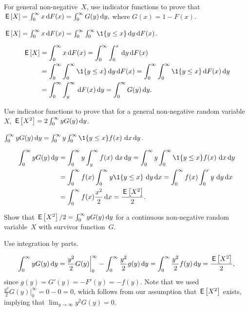 \documentclass[stochastic-or.tex]{subfiles}
\begin{document}
\begin{exercise}\label{ex:l-107}
For  general non-negative~$X$,  use indicator functions to prove that
$ \,\mathsf{E}\left[X\right] = \int_0^\infty x \,\textrm{d}F(x) = \int_0^\infty G(y) \,\textrm{d}y,$
where $G(x) = 1 - F(x)$.
\begin{hint}
$\E X = \int_0^\infty x \d F( x) = \int_0^\infty \int_0^\infty \1{y\leq x} \d y \d F(x)$.
\end{hint}
\begin{solution}
 \begin{align*}
 \E{X} &= \int_0^\infty x \d F(x) = \int_0^\infty \int_0^x \d y \d F(x) \\
 & = \int_0^\infty \int_0^\infty \1{y\leq x} \d y \d F(x) = \int_0^\infty \int_0^\infty \1{y\leq x} \d F(x) \d y\\
 & = \int_0^\infty \int_y^\infty\d  F(x) \d y = \int_0^\infty G(y) \d y.
 \end{align*}
\end{solution}
\end{exercise}


\begin{exercise}\label{ex:14}
  Use indicator functions to prove that for a general non-negative random variable~$X$, $ \,\mathsf{E}\left[X^2\right] = 2 \int_0^\infty y G(y) \,\textrm{d}y$.
\begin{hint}
$\int_0^\infty y G(y) \d y = \int_0^\infty y \int_0^\infty \1{y\leq x}f(x)\, \d x \d y$.
\end{hint}
\begin{solution}
 \begin{align*}
\int_0^\infty y G(y) \d y
&= \int_0^\infty y \int_y^\infty f(x)\, \d x \d y = \int_0^\infty y \int_0^\infty \1{y\leq x}f(x)\, \d x \d y\\
&= \int_0^\infty f(x) \int_0^\infty y \1{y \leq x}\, \d y \d x
= \int_0^\infty f(x) \int_0^x y\, \d y \d x\\
&= \int_0^\infty f(x) \frac{x^2}2 \d x =\frac{\E{X^2}}2.
 \end{align*}
\end{solution}
\end{exercise}

\begin{exercise}\label{ex:l-108}
 Show that $\,\mathsf{E}\left[X^2\right]/2 = \int_0^\infty y G(y) \,\textrm{d}y$ for a continuous non-negative random variable~$X$ with survivor function~$G$.
 \begin{solution}
 \begin{hint}
 Use integration by parts.
 \end{hint}
 \begin{equation*}
 \int_0^\infty y G(y) \,\textrm{d}y
= \frac{y^2}2 G(y) \bigg|_0^\infty - \int_0^\infty \frac{y^2}2 g(y)\,\textrm{d}y = \int_0^\infty \frac{y^2}2 f(y)\,\textrm{d}y = \frac{\,\mathsf{E}\left[X^2\right]}2,
 \end{equation*}
 since $g(y) = G'(y) = - F'(y) = - f(y)$. Note that we used $\frac{y^2}2 G(y) \bigg|_0^\infty = 0 - 0 = 0$, which follows from our assumption that $\,\mathsf{E}\left[X^2\right]$ exists, implying that $\lim_{y \to \infty} y^2G(y) = 0$.
\end{solution}
\end{exercise}
\end{document}
